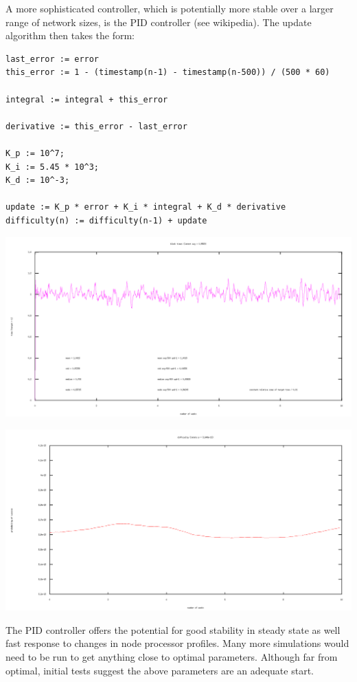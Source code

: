 \documentclass[10pt,a4paper]{article}
\begin{document}
\newpage

A more sophisticated controller, which is potentially more stable over a larger range of network sizes, is the PID controller (see wikipedia). The update algorithm then takes the form:

\begin{verbatim}
last_error := error
this_error := 1 - (timestamp(n-1) - timestamp(n-500)) / (500 * 60)

integral := integral + this_error

derivative := this_error - last_error

K_p := 10^7;
K_i := 5.45 * 10^3;
K_d := 10^-3;

update := K_p * error + K_i * integral + K_d * derivative
difficulty(n) := difficulty(n-1) + update
\end{verbatim}

\includegraphics[width=14cm]{Diagrams/SimulationGraphs/simulation_avg-500_upd-1_PID.png}

\includegraphics[width=14cm]{Diagrams/SimulationGraphs/simulation_avg-500_upd-1_PID_diff.png}

The PID controller offers the potential for good stability in steady state as well fast response to changes in node processor profiles. Many more simulations would need to be run to get anything close to optimal parameters. Although far from optimal, initial tests suggest the above parameters are an adequate start.
\end{document}

